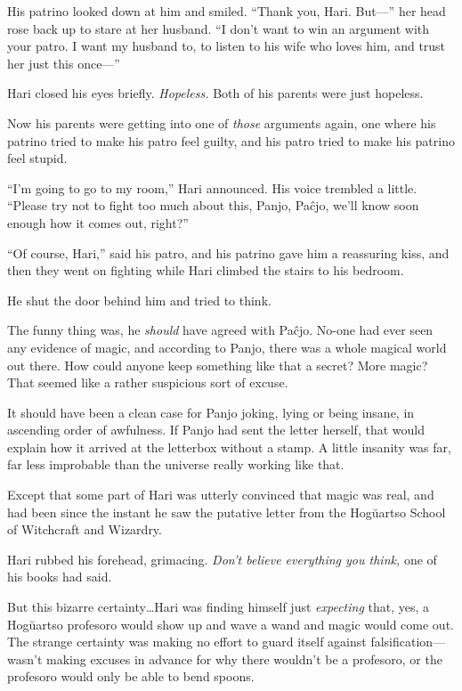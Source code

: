 His patrino looked down at him and smiled. “Thank you, Hari. But—” her head rose back up to stare at her husband. “I don’t want to win an argument with your patro. I want my husband to, to listen to his wife who loves him, and trust her just this once—”

Hari closed his eyes briefly. \emph{Hopeless.} Both of his parents were just hopeless.

Now his parents were getting into one of \emph{those} arguments again, one where his patrino tried to make his patro feel guilty, and his patro tried to make his patrino feel stupid.

“I’m going to go to my room,” Hari announced. His voice trembled a little. “Please try not to fight too much about this, Panjo, Paĉjo, we’ll know soon enough how it comes out, right?”

“Of course, Hari,” said his patro, and his patrino gave him a reassuring kiss, and then they went on fighting while Hari climbed the stairs to his bedroom.

He shut the door behind him and tried to think.

The funny thing was, he \emph{should} have agreed with Paĉjo. No-one had ever seen any evidence of magic, and according to Panjo, there was a whole magical world out there. How could anyone keep something like that a secret? More magic? That seemed like a rather suspicious sort of excuse.

It should have been a clean case for Panjo joking, lying or being insane, in ascending order of awfulness. If Panjo had sent the letter herself, that would explain how it arrived at the letterbox without a stamp. A little insanity was far, far less improbable than the universe really working like that.

Except that some part of Hari was utterly convinced that magic was real, and had been since the instant he saw the putative letter from the Hogŭartso School of Witchcraft and Wizardry.

Hari rubbed his forehead, grimacing. \emph{Don’t believe everything you think,} one of his books had said.

But this bizarre certainty…Hari was finding himself just \emph{expecting} that, yes, a Hogŭartso profesoro would show up and wave a wand and magic would come out. The strange certainty was making no effort to guard itself against falsification—wasn’t making excuses in advance for why there wouldn’t be a profesoro, or the profesoro would only be able to bend spoons.

